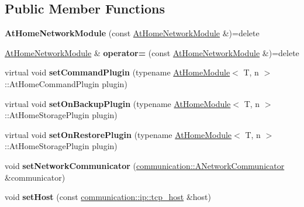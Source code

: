 \subsection*{Public Member Functions}
\begin{DoxyCompactItemize}
\item 
\mbox{\label{classathome_1_1module_1_1_at_home_network_module_a1d2da6fec6ca0f45ba75d42a364f8954}} 
{\bfseries At\+Home\+Network\+Module} (const \mbox{\hyperlink{classathome_1_1module_1_1_at_home_network_module}{At\+Home\+Network\+Module}} \&)=delete
\item 
\mbox{\label{classathome_1_1module_1_1_at_home_network_module_abd5f316e792169fd36206b74e47b292d}} 
\mbox{\hyperlink{classathome_1_1module_1_1_at_home_network_module}{At\+Home\+Network\+Module}} \& {\bfseries operator=} (const \mbox{\hyperlink{classathome_1_1module_1_1_at_home_network_module}{At\+Home\+Network\+Module}} \&)=delete
\item 
\mbox{\label{classathome_1_1module_1_1_at_home_network_module_a274f5a89f9843e67c662f2cf15f6f259}} 
virtual void {\bfseries set\+Command\+Plugin} (typename \mbox{\hyperlink{classathome_1_1module_1_1_at_home_module}{At\+Home\+Module}}$<$ T, n $>$\+::At\+Home\+Command\+Plugin plugin)
\item 
\mbox{\label{classathome_1_1module_1_1_at_home_network_module_ab63d8d6a336d561e167300bcb455404e}} 
virtual void {\bfseries set\+On\+Backup\+Plugin} (typename \mbox{\hyperlink{classathome_1_1module_1_1_at_home_module}{At\+Home\+Module}}$<$ T, n $>$\+::At\+Home\+Storage\+Plugin plugin)
\item 
\mbox{\label{classathome_1_1module_1_1_at_home_network_module_a30d81810788f945d0998ca94d67f3614}} 
virtual void {\bfseries set\+On\+Restore\+Plugin} (typename \mbox{\hyperlink{classathome_1_1module_1_1_at_home_module}{At\+Home\+Module}}$<$ T, n $>$\+::At\+Home\+Storage\+Plugin plugin)
\item 
\mbox{\label{classathome_1_1module_1_1_at_home_network_module_a34b6119931c22334085816f1060537ee}} 
void {\bfseries set\+Network\+Communicator} (\mbox{\hyperlink{classathome_1_1communication_1_1_a_network_communicator}{communication\+::\+A\+Network\+Communicator}} \&communicator)
\item 
\mbox{\label{classathome_1_1module_1_1_at_home_network_module_a52d8845deb42ed1fd8230068f7810ec2}} 
void {\bfseries set\+Host} (const \mbox{\hyperlink{structathome_1_1communication_1_1ip_1_1s__host}{communication\+::ip\+::tcp\+\_\+host}} \&host)
\end{DoxyCompactItemize}
